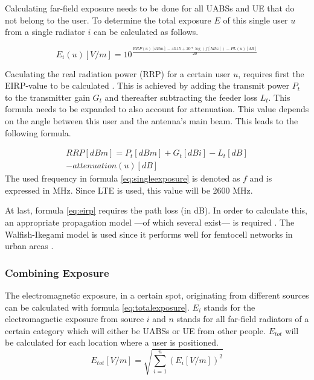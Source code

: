 \documentclass[twocolumn]{phdsymp} %
\begin{document}
Calculating far-field exposure needs to be done for all UABSs and UE that do not belong to the user.
To determine the total exposure $E$ of this single user $u$ from a single radiator $i$ can be calculated
as follows.

\begin{equation}
E_i(u) [V/m] = 10^{\frac{RRP(u)[dBm] - 43.15 + 20*\log(f [Mhz])- PL(u) [dB]}{20}}
\label{eq:singleexposure}
\end{equation}

Caculating the real radiation power (RRP) for a certain user $u$, requires first the EIRP-value to be calculated  \cite{J6_originalExposureFormula,J1}.
This is achieved by adding the transmit power $P_t$ to the transmitter gain $G_t$ and thereafter subtracting the feeder loss $L_t$.
This formula needs to be expanded to also account for attenuation. This value depends on the angle 
between this user and the antenna's main beam. This leads to the following formula.

\begin{equation}
\begin{aligned}
RRP [dBm] = P_t [dBm] + G_t [dBi]- L_t [dB]\\
     - attenuation(u) [dB]
\end{aligned}
\label{eq:eirp}
\end{equation}
The used frequency in formula \ref{eq:singleexposure} is denoted as $f$ and is expressed in MHz. Since \gls{LTE} is used, this value will be 2600 MHz.

At last, formula \ref{eq:eirp} requires the path loss (in dB). In order to calculate this, an appropriate propagation model ---of which several exist--- is required .
The Walfish-Ikegami model is used since it performs well for femtocell networks in urban areas \cite{J2}. %

\subsubsection{Combining Exposure}
The electromagnetic exposure, in a certain spot, originating from different sources can be calculated with formula \ref{eq:totalexposure}. $E_i$ stands for 
the electromagnetic exposure from source $i$ and
$n$ stands for all far-field radiators of a certain category which will either be UABSs or UE from other people.
$E_{tot}$ will be calculated for each location where a user is positioned.  
\begin{equation}
E_{tot} [V/m] = \sqrt{\sum_{i=1}^{n} (E_i [V/m]) ^2}
\label{eq:totalexposure}
\end{equation}
\end{document}
